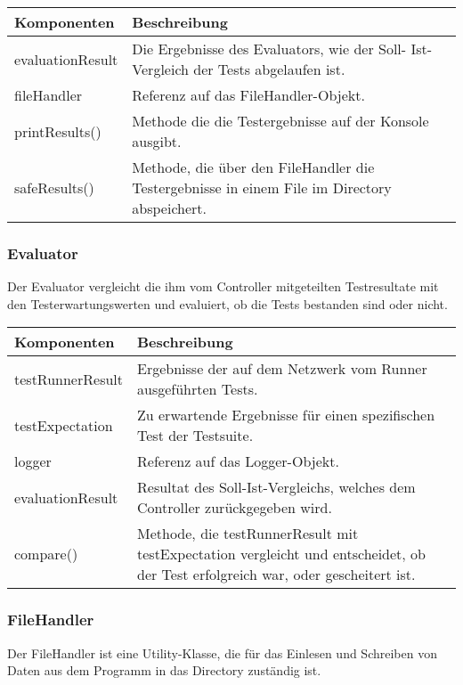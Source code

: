 \documentclass[
	ngerman,
	toc=listof, %
	toc=bibliography, %
	footnotes=multiple, %
	parskip=half, %
	numbers=noendperiod %
]{scrartcl}
\begin{document}
	\begin{tabularx}{\textwidth}{lX}
		\toprule
			Komponenten & Beschreibung \\
		\midrule
			evaluationResult & Die Ergebnisse des Evaluators, wie der Soll- Ist-Vergleich der Tests abgelaufen ist. \\
			fileHandler & Referenz auf das FileHandler-Objekt. \\	
		\midrule
			printResults() & Methode die die Testergebnisse auf der Konsole ausgibt. \\
			safeResults() & Methode, die über den FileHandler die Testergebnisse in einem File im Directory abspeichert. \\
		\bottomrule
	\end{tabularx}

	\subsubsection{Evaluator}
	Der Evaluator vergleicht die ihm vom Controller mitgeteilten Testresultate mit den Testerwartungswerten und evaluiert, ob die Tests bestanden sind oder nicht.

	\begin{tabularx}{\textwidth}{lX}
		\toprule
			Komponenten & Beschreibung \\
		\midrule
			testRunnerResult & Ergebnisse der auf dem Netzwerk vom Runner ausgeführten Tests. \\
			testExpectation & Zu erwartende Ergebnisse für einen spezifischen Test der Testsuite. \\
			logger & Referenz auf das Logger-Objekt. \\
			evaluationResult & Resultat des Soll-Ist-Vergleichs, welches dem Controller zurückgegeben wird.\\
		\midrule
			compare() & Methode, die testRunnerResult mit testExpectation vergleicht und entscheidet, ob der Test erfolgreich war, oder gescheitert ist. \\
		\bottomrule
	\end{tabularx}
	\newpage

	\subsubsection{FileHandler}
	Der FileHandler ist eine Utility-Klasse, die für das Einlesen und Schreiben von Daten aus dem Programm in das Directory zuständig ist.
	
\end{document}
